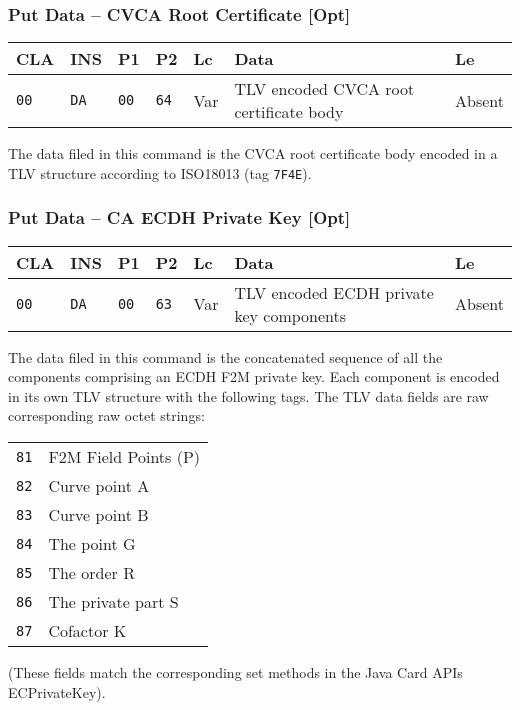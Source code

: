 \documentclass{article}
\begin{document}
\subsubsection{Put Data -- CVCA Root Certificate [Opt]}

\begin{flushleft}
\begin{tabular}{|l|l|l|l|l|l|l|}
\hline
CLA & INS & P1 & P2 & Lc & Data & Le \\
\hline
\texttt{00} & \texttt{DA} & \texttt{00} & \texttt{64} &
Var & TLV encoded CVCA root certificate body & Absent \\
\hline
\end{tabular}
\end{flushleft}
The data filed in this command is the CVCA root certificate body
encoded in a TLV structure according to ISO18013 (tag \texttt{7F4E}).

\subsubsection{Put Data -- CA ECDH Private Key [Opt]}

\begin{flushleft}
\begin{tabular}{|l|l|l|l|l|l|l|}
\hline
CLA & INS & P1 & P2 & Lc & Data & Le \\
\hline
\texttt{00} & \texttt{DA} & \texttt{00} & \texttt{63} &
Var & TLV encoded ECDH private key components & Absent \\
\hline
\end{tabular}
\end{flushleft}
The data filed in this command is the concatenated sequence of all the
components comprising an ECDH F2M private key.  Each component is
encoded in its own TLV structure with the following tags. The TLV data
fields are raw corresponding raw octet strings:
\begin{flushleft}
\begin{tabular}{|l|l|}
\hline
\texttt{81} & F2M Field Points (P)\\
\texttt{82} & Curve point A \\
\texttt{83} & Curve point B\\
\texttt{84} & The point G\\
\texttt{85} & The order R\\
\texttt{86} & The private part S\\
\texttt{87} & Cofactor K\\
\hline
\end{tabular}
\end{flushleft}
(These fields match the corresponding set methods in the Java Card
APIs ECPrivateKey).
\end{document}
